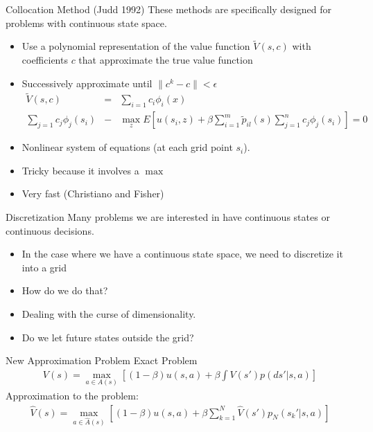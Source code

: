 \documentclass[xcolor=pdftex,dvipsnames,table,mathserif,aspectratio=169]{beamer}
\begin{document}
\begin{frame}{Collocation Method (Judd 1992)}
These methods are specifically designed for problems with continuous state space.
\begin{itemize}
\item Use a polynomial representation of the value function $\tilde{V}(s,c)$ with coefficients $c$ that approximate the true value function
\item Successively approximate until $\| c^k - c \| < \epsilon$
\begin{eqnarray*}
\tilde{V}(s,c) &=& \sum_{i=1}c_i \phi_i(x)\\
 \sum_{j=1} c_j \phi_j (s_i) &-& \max_z E \left[ u(s_i,z) + \beta \sum_{i=1}^m \tilde p_{il} (s) \sum_{j=1}^n c_j \phi_j (s_i) \right] = 0
\end{eqnarray*}
\item Nonlinear system of equations (at each grid point $s_i$).
\item Tricky because it involves a $\max$
\item Very fast (Christiano and Fisher)
\end{itemize}
\end{frame}

\begin{frame}{Discretization}
Many problems we are interested in have continuous states or continuous decisions.
\begin{itemize}
\item In the case where we have a continuous state space, we need to discretize it into a grid
\item How do we do that?
\item Dealing with the curse of dimensionality.
\item Do we let future states outside the grid?
\end{itemize}
\end{frame}

\begin{frame}{New Approximation Problem}
Exact Problem
\begin{eqnarray*}
V(s) = \max_{a \in A(s)} \left[ (1-\beta) u(s,a) + \beta \int V(s')p(ds' | s,a) \right]
\end{eqnarray*}
Approximation to the problem:
\begin{eqnarray*}
\hat{V}(s) = \max_{a \in \hat{A}(s)} \left[ (1-\beta) u(s,a) + \beta \sum_{k=1}^N \hat{V}(s')p_N (s_k' | s,a) \right]
\end{eqnarray*}
\end{frame}
\end{document}
